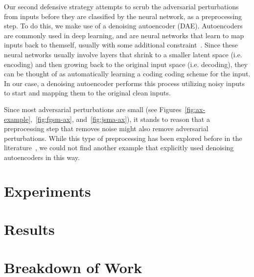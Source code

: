 \documentclass{article}
\begin{document}
Our second defensive strategy attempts to scrub the adversarial perturbations
from inputs before they are classified by the neural network, as a preprocessing
step. To do this, we make use of a denoising autoencoder (DAE). Autoencoders are
commonly used in deep learning, and are neural networks that learn to map inputs
back to themself, usually with some additional
constraint~\cite{goodfellow2016deep}. Since these neural networks usually
involve layers that shrink to a smaller latent space (i.e\@. encoding) and then
growing back to the original input space (i.e\@. decoding), they can be thought
of as automatically learning a coding coding scheme for the input. In our case,
a denoising autoencoder performs this process utilizing noisy inputs to start
and mapping them to the original clean inputs.

Since most adversarial perturbations are small (see
Figures~\ref{fig:ax-example},~\ref{fig:fgsm-ax}, and~\ref{fig:jsma-ax}), it
stands to reason that a preprocessing step that removes noise might also remove
adversarial perturbations. While this type of preprocessing has been explored
before in the literature~\cite{graese2016assessing,shenape}, we could not find
another example that explicitly used denoising autoencoders in this way.

\section{Experiments}

\section{Results}


\section{Breakdown of Work}

%


\end{document}
